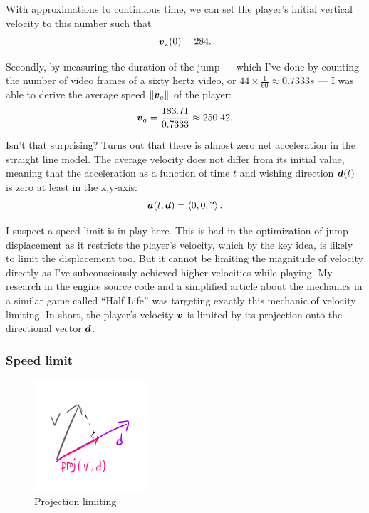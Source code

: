With approximations to continuous time, we can set the player's initial vertical velocity to this number such that
\[
    \boldsymbol{v}_{z}(0) = 284.
\]


Secondly, by measuring the duration of the jump --- which I've done by counting the number of video frames of a sixty hertz video, or $44 \times \frac{1}{60} \approx 0.7333 \si{s}$ --- I was able to derive the average speed $\|\boldsymbol{v}_{a}\|$ of the player:
\[
    \boldsymbol{v}_{a} = \frac{183.71}{0.7333} \approx 250.42.
\]

Isn't that surprising? Turns out that there is almost zero net acceleration in the straight line model. The average velocity does not differ from its initial value, meaning that the acceleration as a function of time $t$ and wishing direction $\boldsymbol{d}(t)$ is zero at least in the x,y-axis:
\[
    \boldsymbol{a}(t, \boldsymbol{d}) = \left\langle 0, 0, ? \right\rangle.
\]

I suspect a speed limit is in play here. This is bad in the optimization of jump displacement as it restricts the player's velocity, which by the key idea, is likely to limit the displacement too. But it cannot be limiting the magnitude of velocity directly as I've subconsciously achieved higher velocities while playing. My research in the engine source code \parencite{valvesoftware} and a simplified article about the mechanics in a similar game called ``Half Life'' \parencite{jwchong} was targeting exactly this mechanic of velocity limiting. In short, the player's velocity $\boldsymbol{v}$ is limited by its projection onto the directional vector $\boldsymbol{d}$.

\subsubsection{Speed limit}
\begin{figure}
    \includegraphics[width=0.37\textwidth,right]{assets/2proj.png}
    \caption{\vspace{8ex} Projection limiting}
    \label{fig:2proj}
\end{figure}

